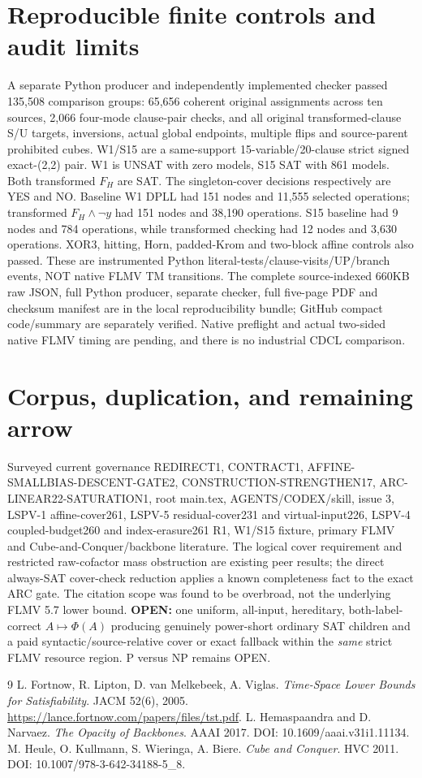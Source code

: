 \documentclass[11pt]{article}
\begin{document}
\section{Reproducible finite controls and audit limits}
A separate Python producer and independently implemented checker passed 135,508 comparison groups: 65,656 coherent original assignments across ten sources, 2,066 four-mode clause-pair checks, and all original transformed-clause S/U targets, inversions, actual global endpoints, multiple flips and source-parent prohibited cubes. W1/S15 are a same-support 15-variable/20-clause strict signed exact-(2,2) pair. W1 is UNSAT with zero models, S15 SAT with 861 models. Both transformed $F_H$ are SAT. The singleton-cover decisions respectively are YES and NO. Baseline W1 DPLL had 151 nodes and 11,555 selected operations; transformed $F_H\land\neg y$ had 151 nodes and 38,190 operations. S15 baseline had 9 nodes and 784 operations, while transformed checking had 12 nodes and 3,630 operations. XOR3, hitting, Horn, padded-Krom and two-block affine controls also passed. These are instrumented Python literal-tests/clause-visits/UP/branch events, NOT native FLMV TM transitions.
The complete source-indexed 660KB raw JSON, full Python producer, separate checker, full five-page PDF and checksum manifest are in the local reproducibility bundle; GitHub compact code/summary are separately verified. Native preflight and actual two-sided native FLMV timing are pending, and there is no industrial CDCL comparison.
\section{Corpus, duplication, and remaining arrow}
Surveyed current governance REDIRECT1, CONTRACT1, AFFINE-SMALLBIAS-DESCENT-GATE2, CONSTRUCTION-STRENGTHEN17, ARC-LINEAR22-SATURATION1, root main.tex, AGENTS/CODEX/skill, issue 3, LSPV-1 affine-cover261, LSPV-5 residual-cover231 and virtual-input226, LSPV-4 coupled-budget260 and index-erasure261 R1, W1/S15 fixture, primary FLMV and Cube-and-Conquer/backbone literature. The logical cover requirement and restricted raw-cofactor mass obstruction are existing peer results; the direct always-SAT cover-check reduction applies a known completeness fact to the exact ARC gate. The citation scope was found to be overbroad, not the underlying FLMV 5.7 lower bound.
\noindent\textbf{OPEN:} one uniform, all-input, hereditary, both-label-correct $A\mapsto\Phi(A)$ producing genuinely power-short ordinary SAT children and a paid syntactic/source-relative cover or exact fallback within the \emph{same} strict FLMV resource region. P versus NP remains OPEN.
\begin{thebibliography}{9}
 L. Fortnow, R. Lipton, D. van Melkebeek, A. Viglas. \emph{Time-Space Lower Bounds for Satisfiability}. JACM 52(6), 2005. \url{https://lance.fortnow.com/papers/files/tst.pdf}.
 L. Hemaspaandra and D. Narvaez. \emph{The Opacity of Backbones}. AAAI 2017. DOI: 10.1609/aaai.v31i1.11134.
 M. Heule, O. Kullmann, S. Wieringa, A. Biere. \emph{Cube and Conquer}. HVC 2011. DOI: 10.1007/978-3-642-34188-5\_8.
\end{thebibliography}
\end{document}
